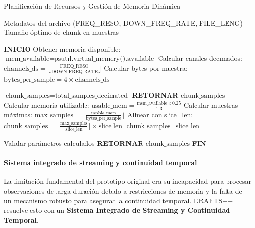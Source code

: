 \begin{algorithm}[H]
\caption{Planificación de Recursos y Gestión de Memoria Dinámica}
\label{alg:resource-planning}
\begin{algorithmic}[1]
\Require Metadatos del archivo (FREQ\_RESO, DOWN\_FREQ\_RATE, FILE\_LENG)
\Ensure Tamaño óptimo de chunk en muestras

\State \textbf{INICIO}
\State Obtener memoria disponible: $\text{mem\_available} = \text{psutil.virtual\_memory().available}$
\State Calcular canales decimados: $\text{channels\_ds} = \lfloor \frac{\text{FREQ\_RESO}}{\text{DOWN\_FREQ\_RATE}} \rfloor$
\State Calcular bytes por muestra: $\text{bytes\_per\_sample} = 4 \times \text{channels\_ds}$

    \State $\text{chunk\_samples} = \text{total\_samples\_decimated}$
    \State \textbf{RETORNAR} $\text{chunk\_samples}$
\Else
    \State Calcular memoria utilizable: $\text{usable\_mem} = \frac{\text{mem\_available} \times 0.25}{1.3}$
    \State Calcular muestras máximas: $\text{max\_samples} = \lfloor \frac{\text{usable\_mem}}{\text{bytes\_per\_sample}} \rfloor$
    \State Alinear con slice\_len: $\text{chunk\_samples} = \lfloor \frac{\text{max\_samples}}{\text{slice\_len}} \rfloor \times \text{slice\_len}$
        \State $\text{chunk\_samples} = \text{slice\_len}$ 
    \EndIf
\EndIf

\State Validar parámetros calculados
\State \textbf{RETORNAR} $\text{chunk\_samples}$
\State \textbf{FIN}
\end{algorithmic}
\end{algorithm}

\paragraph{Sistema integrado de streaming y continuidad temporal}

La limitación fundamental del prototipo original era su incapacidad para procesar observaciones de larga duración debido a restricciones de memoria y la falta de un mecanismo robusto para asegurar la continuidad temporal. DRAFTS++ resuelve esto con un \textbf{Sistema Integrado de Streaming y Continuidad Temporal}.

